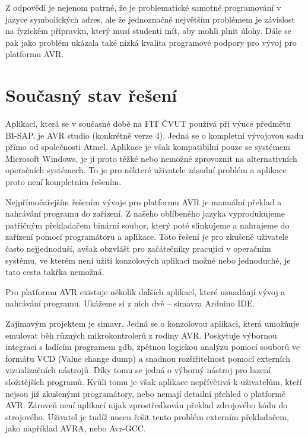 Z odpovědí je nejenom patrné, že je problematické samotné programování v jazyce symbolických adres, ale že jednoznačně největším problémem je závislost na fyzickém přípravku, který musí studenti mít, aby mohli plnit úlohy. Dále se pak jako problém ukázala také nízká kvalita programové podpory pro vývoj pro platformu AVR.

\section{Současný stav řešení}

Aplikací, která se v současné době na FIT ČVUT používá při výuce předmětu BI-SAP\todocite, je AVR studio (konkrétně verze 4). Jedná se o kompletní vývojovou sadu přímo od společnosti Atmel\todocite. Aplikace je však kompatibilní pouze se systémem Microsoft Windows\todocite, je ji proto těžké nebo nemožné zprovoznit na alternativních operačních systémech. To je pro některé uživatele zásadní problém a aplikace proto není kompletním řešením.

Nejpřímočařejším řešením vývoje pro platformu AVR je manuální překlad a nahrávání programu do zařízení. Z našeho oblíbeného jazyka vyprodukujeme patřičným překladačem binární soubor, který poté slinkujeme a nahrajeme do zařízení pomocí programátoru a aplikace. Toto řešení je pro zkušené uživatele často nejjednoduší, avšak obzvlášť pro začátečníky pracující v operačním systému, ve kterém není užití konzolových aplikací možné nebo jednoduché, je tato cesta takřka nemožná.

Pro platformu AVR existuje několik dalších aplikací, které usnadňují vývoj a nahrávání programu. Ukážeme si z nich dvě -- simavr\todocite a Arduino IDE\todocite.


Zajímavým projektem je simavr\todocite. Jedná se o konzolovou aplikaci, která umožňuje emulovat běh různých mikrokontrolerů z rodiny AVR. Poskytuje výbornou integraci s ladícím programem gdb, zpětnou logickou analýzu pomocí souborů ve formátu VCD (Value change dump) a snadnou rozšiřitelnost pomocí externích vizualizačních nástrojů. Díky tomu se jedná o výborný nástroj pro lazení složitějších programů. Kvůli tomu je však aplikace nepřívětivá k uživatelům, kteří nejsou již zkušenými programátory, nebo nemají detailní přehled o platformě AVR. Zároveň není aplikací nijak zprostředkován překlad zdrojového kódu do strojového. Uživatel je tudíž nucen řešit tento problém externím překladačem, jako například AVRA\todocite, nebo Avr-GCC\todocite.

